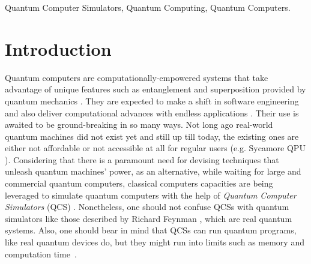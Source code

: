 \documentclass[conference]{IEEEtran}
\begin{document}
\begin{IEEEkeywords}
Quantum Computer Simulators, Quantum Computing, Quantum Computers.
\end{IEEEkeywords}

\vspace{-0.5em}

\section{Introduction}
 
Quantum computers are computationally-empowered systems that take advantage of unique features such as entanglement and superposition provided by quantum mechanics \cite{ref_6}. They are expected to make a shift in software engineering and also deliver computational advances with endless applications \cite{ref_5}. Their use is awaited to be ground-breaking in so many ways. Not long ago real-world quantum machines did not exist yet and still up till today, the existing ones are either not affordable or not accessible at all for regular users (e.g. Sycamore QPU \cite{ref_5}). Considering that there is a paramount need for devising techniques that unleash quantum machines' power, as an alternative, while waiting for large and commercial quantum computers, classical computers capacities are being leveraged to simulate quantum computers with the help of \emph{Quantum Computer Simulators} (QCS) \cite{ref_1}. Nonetheless, one should not confuse QCSs with quantum simulators like those described by Richard Feynman \cite{ref_2}, which are real quantum systems. Also, one should bear in mind that QCSs can run quantum programs, like real quantum devices do, but they might run into limits such as memory and computation time~\cite{ref_5}.
\end{document}

